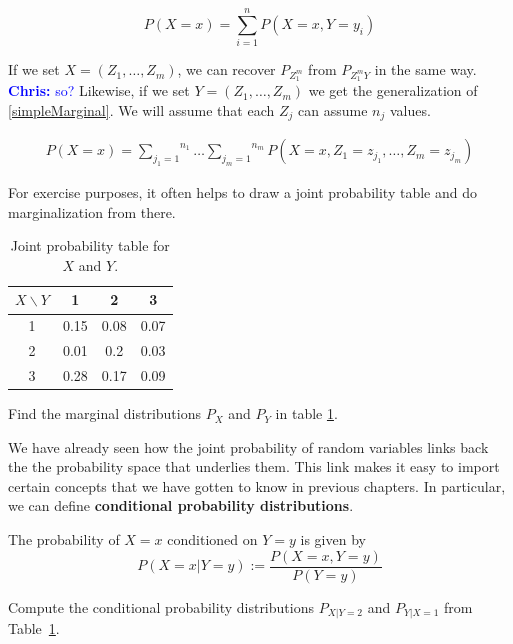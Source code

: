 \documentclass[a4paper,11pt,leqno]{report}
\newcommand{\chris}[1]{ \textcolor{blue}{\textbf{Chris:} #1}}
\begin{document}
\begin{equation} \label{simpleMarginal}
P(X=x) = \overset{n}{\underset{i=1}{\sum}} P(X=x,Y=y_{i}) 
\end{equation}

If we set $ X = (Z_{1}, \ldots, Z_{m}) $, we can recover $ P_{Z_{1}^{m}} $ from $ P_{Z_{1}^{m}Y} $ in the same way.\chris{so?} Likewise,
if we set $ Y = (Z_{1}, \ldots, Z_{m}) $ we get the generalization of \eqref{simpleMarginal}. We will assume that each $ Z_{j} $
can assume $ n_{j} $ values.

\begin{align}
P(X=x) = \overset{n_{1}}{\underset{j_{1}=1}{\sum}}\ldots \overset{n_{m}}{\underset{j_{m}=1}{\sum}} 
P(X=x,Z_{1}=z_{j_{1}}, \ldots, Z_{m}=z_{j_{m}})
\end{align}

For exercise purposes, it often helps to draw a joint probability table and do marginalization from there.

\begin{table}
\center
\begin{tabular}{|c|c|c|c|}
\hline
$X\backslash Y$	& 1		& 2		& 3		\\
\hline
1				& 0.15	& 0.08	& 0.07	\\
2				& 0.01	& 0.2	& 0.03	\\	
3				& 0.28	& 0.17	& 0.09	\\
\hline
\end{tabular}
\caption{Joint probability table for $ X $ and $ Y $.}
\label{jointTable}
\end{table}

\begin{Exercise}
Find the marginal distributions $ P_X $ and $ P_{Y} $ in table \ref{jointTable}.
\end{Exercise}

We have already seen how the joint probability of random variables links back the the probability space that underlies them.
This link makes it easy to import certain concepts that we have
gotten to know in previous chapters. In particular, we can define \textbf{conditional probability distributions}.

\begin{Definition}
The probability of $ X = x $ conditioned on $ Y=y $ is given by
$$ P(X=x|Y=y) := \dfrac{P(X=x, Y=y)}{P(Y=y)} $$
\end{Definition} 

\begin{Exercise}
Compute the conditional probability distributions $ P_{X|Y=2} $ and $ P_{Y|X=1} $ from Table~\ref{jointTable}.
\end{Exercise}
\end{document}
